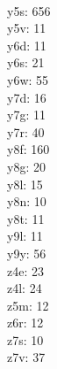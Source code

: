 \begin{multicols}{8}
  \\ y5s: 656
  \\ y5v: 11
  \\ y6d: 11
  \\ y6s: 21
  \\ y6w: 55
  \\ y7d: 16
  \\ y7g: 11
  \\ y7r: 40
  \\ y8f: 160
  \\ y8g: 20
  \\ y8l: 15
  \\ y8n: 10
  \\ y8t: 11
  \\ y9l: 11
  \\ y9y: 56
  \\ z4e: 23
  \\ z4l: 24
  \\ z5m: 12
  \\ z6r: 12
  \\ z7s: 10
  \\ z7v: 37
\end{multicols}